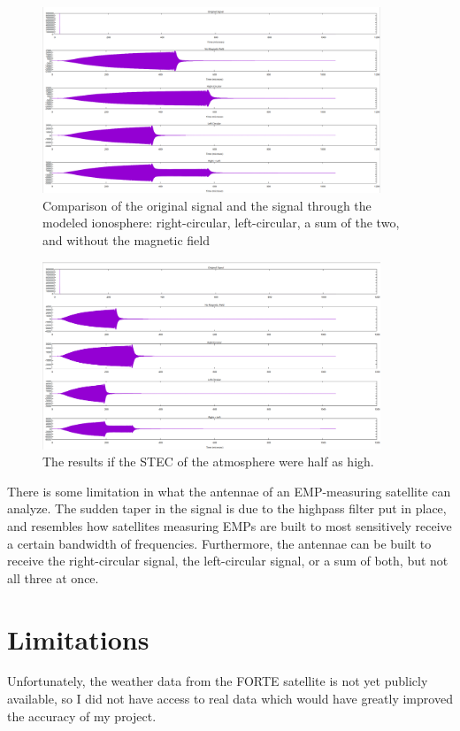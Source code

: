 \documentclass[12pt, reqno]{amsart}
\begin{document}
\begin{figure}[h]
    \centering
    \includegraphics[width= 0.9\textwidth]{signal_final_results.png}
    \caption{\small Comparison of the original signal and the signal through the modeled ionosphere: right-circular, left-circular, a sum of the two, and without the magnetic field}
    \label{fig:signal-final-results}
\end{figure}

 \begin{figure}[h]
    \centering
    \includegraphics[width= 0.9\textwidth]{signal_stec_15.png}
    \caption{\small The results if the STEC of the atmosphere were half as high. }
    \label{fig:signal-final-results}
\end{figure}

\noindent There is some limitation in what the antennae of an EMP-measuring satellite can analyze.
The sudden taper in the signal is due to the highpass filter put in place, and resembles how satellites measuring EMPs are built to most sensitively receive a certain bandwidth of frequencies.
Furthermore, the antennae can be built to receive the right-circular signal, the left-circular signal, or a sum of both, but not all three at once.

\section{Limitations}
\noindent Unfortunately, the weather data from the FORTE satellite is not yet publicly available, so I did not have access to real data which would have greatly improved the accuracy of my project.
\end{document}
